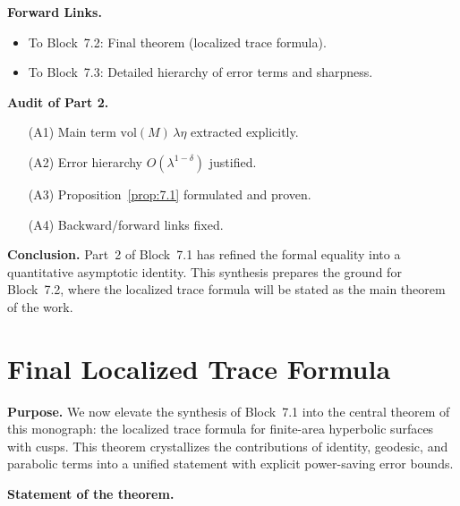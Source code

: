 \medskip

\noindent\textbf{Forward Links.}
\begin{itemize}
  \item To Block~7.2: Final theorem (localized trace formula).
  \item To Block~7.3: Detailed hierarchy of error terms and sharpness.
\end{itemize}

\medskip

\noindent\textbf{Audit of Part 2.}
\begin{itemize}
  \item[(A1)] Main term $\mathrm{vol}(M)\,\lambda\eta$ extracted explicitly.
  \item[(A2)] Error hierarchy $O(\lambda^{1-\delta})$ justified.
  \item[(A3)] Proposition~\ref{prop:7.1} formulated and proven.
  \item[(A4)] Backward/forward links fixed.
\end{itemize}

\medskip

\noindent\textbf{Conclusion.}
Part~2 of Block~7.1 has refined the formal equality into a quantitative asymptotic identity.  
This synthesis prepares the ground for Block~7.2, where the localized trace formula will be stated as the main theorem of the work.



\section{Final Localized Trace Formula}

\noindent\textbf{Purpose.}
We now elevate the synthesis of Block~7.1 into the central theorem of this monograph: the localized trace formula for finite-area hyperbolic surfaces with cusps.  
This theorem crystallizes the contributions of identity, geodesic, and parabolic terms into a unified statement with explicit power-saving error bounds.

\medskip

\noindent\textbf{Statement of the theorem.}

